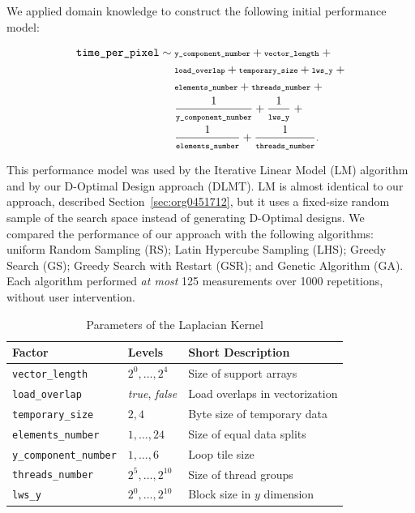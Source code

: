 \documentclass[conference]{IEEEtran}
\begin{document}
We applied domain knowledge to construct the following initial performance model:
\vspace{-2pt}
\\\begin{minipage}{\linewidth}\scriptsize
\begin{align}
\label{eq:gpu_laplacian_performance_model}
\texttt{time\_per\_pixel} \sim & \scriptsize\; \texttt{y\_component\_number} + \texttt{vector\_length} \; + \nonumber \\
& \scriptsize\; \texttt{load\_overlap} + \texttt{temporary\_size} + \texttt{lws\_y} \; + \nonumber \\
& \scriptsize\; \texttt{elements\_number} + \texttt{threads\_number}  \; + \nonumber \\
& \scriptsize\; \frac{1}{\texttt{y\_component\_number}} + \frac{1}{\texttt{lws\_y}} \; + \\
& \scriptsize\; \frac{1}{\texttt{elements\_number}} + \frac{1}{\texttt{threads\_number}}\text{.} \nonumber
\end{align}
\vspace{2pt}
\end{minipage}
This performance model was used by the Iterative Linear Model (LM) algorithm and
by our D-Optimal Design approach (DLMT). LM is almost identical to our approach,
described Section~\ref{sec:org0451712}, but it uses a
fixed-size random sample of the search space instead of generating D-Optimal
designs. We compared the performance of our approach with the following
algorithms: uniform Random Sampling (RS); Latin Hypercube Sampling (LHS); Greedy
Search (GS); Greedy Search with Restart (GSR); and Genetic Algorithm (GA). Each
algorithm performed \emph{at most} 125 measurements over 1000 repetitions, without
user intervention.

\begin{table}[t]
\caption{\label{tab:org4c618ca}
Parameters of the Laplacian Kernel}
\centering
\scriptsize
\begin{tabular}{llp{}}
\toprule
Factor & Levels & Short Description\\
\midrule
\texttt{vector\_length} & \(2^0,\dots,2^4\) & Size of support arrays\\
\texttt{load\_overlap} & \textit{true}, \textit{false} & Load overlaps in vectorization\\
\texttt{temporary\_size} & \(2,4\) & Byte size of temporary data\\
\texttt{elements\_number} & \(1,\dots,24\) & Size of equal data splits\\
\texttt{y\_component\_number} & \(1,\dots,6\) & Loop tile size\\
\texttt{threads\_number} & \(2^5,\dots,2^{10}\) & Size of thread groups\\
\texttt{lws\_y} & \(2^0,\dots,2^{10}\) & Block size in \(y\) dimension\\
\bottomrule
\end{tabular}
\end{table}
\end{document}
